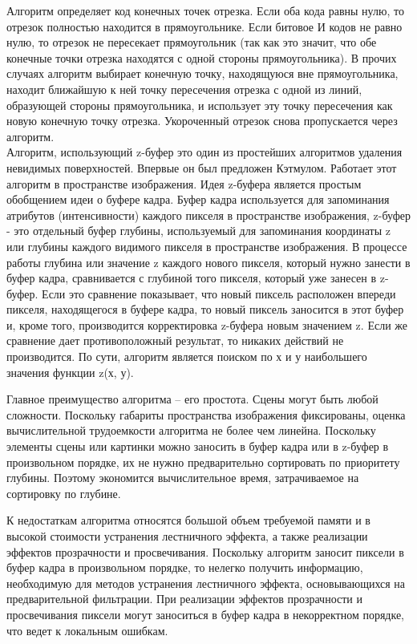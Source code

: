 Алгоритм определяет код конечных точек отрезка. Если оба кода равны нулю, то отрезок полностью находится в прямоугольнике. Если битовое И кодов не равно нулю, то отрезок не пересекает прямоугольник (так как это значит, что обе конечные точки отрезка находятся с одной стороны прямоугольника). В прочих случаях алгоритм выбирает конечную точку, находящуюся вне прямоугольника, находит ближайшую к ней точку пересечения отрезка с одной из линий, образующей стороны прямоугольника, и использует эту точку пересечения как новую конечную точку отрезка. Укороченный отрезок снова пропускается через алгоритм. \cite{REMOVE_FACES}\\


Алгоритм, использующий z-буфер это один из простейших алгоритмов удаления невидимых поверхностей. Впервые он был предложен Кэтмулом. Работает этот алгоритм в пространстве изображения. Идея z-буфера является простым обобщением идеи о буфере кадра. Буфер кадра используется для запоминания атрибутов (интенсивности) каждого пикселя в пространстве изображения, z-буфер - это отдельный буфер глубины, используемый для запоминания координаты z или глубины каждого видимого пикселя в пространстве изображения. В процессе работы глубина или значение z каждого нового пикселя, который нужно занести в буфер кадра, сравнивается с глубиной того пикселя, который уже занесен в z-буфер. Если это сравнение показывает, что новый пиксель расположен впереди пикселя, находящегося в буфере кадра, то новый пиксель заносится в этот буфер и, кроме того, производится корректировка z-буфера новым значением z. Если же сравнение дает противоположный результат, то никаких действий не производится. По сути, алгоритм является поиском по х и у наибольшего значения функции z(х, у).

Главное преимущество алгоритма – его простота. Сцены могут быть любой сложности. Поскольку габариты пространства изображения фиксированы, оценка вычислительной трудоемкости алгоритма не более чем линейна. Поскольку элементы сцены или картинки можно заносить в буфер кадра или в z-буфер в произвольном порядке, их не нужно предварительно сортировать по приоритету глубины. Поэтому экономится вычислительное время, затрачиваемое на сортировку по глубине.

К недостаткам алгоритма относятся большой объем требуемой памяти и в высокой стоимости устранения лестничного эффекта, а также реализации эффектов прозрачности и просвечивания. Поскольку алгоритм заносит пиксели в буфер кадра в произвольном порядке, то нелегко получить информацию, необходимую для методов устранения лестничного эффекта, основывающихся на предварительной фильтрации. При реализации эффектов прозрачности и просвечивания пиксели могут заноситься в буфер кадра в некорректном порядке, что ведет к локальным ошибкам. \cite{ZBuff}\\

